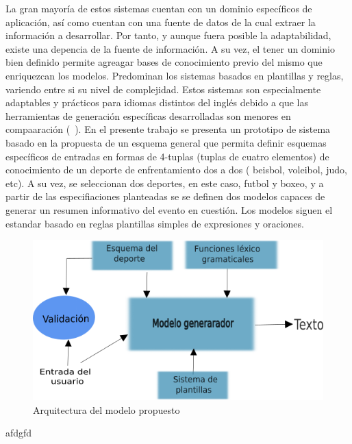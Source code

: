     La gran mayoría de estos sistemas cuentan con un dominio específicos de aplicación, así como cuentan con una fuente de datos de la 
cual extraer la información a desarrollar. Por tanto, y aunque fuera posible la adaptabilidad, existe una depencia de la fuente de información. A su vez, el tener un dominio bien definido  
permite agreagar bases de conocimiento previo del mismo que enriquezcan los modelos. Predominan los sistemas basados en plantillas y reglas, variendo entre si su nivel de complejidad. Estos 
sistemas son especialmente adaptables y prácticos para idiomas distintos del inglés debido a que las herramientas de generación específicas desarrolladas son menores en compaaración (~\cite{gunasiri2021automated}). 
    En el presente trabajo se presenta un prototipo de sistema basado en la propuesta de un esquema general que permita definir esquemas específicos de entradas en formas de 4-tuplas (tuplas de cuatro elementos) de 
conocimiento de un deporte de enfrentamiento dos a dos ( beisbol, voleibol, judo, etc). A su vez, se seleccionan dos deportes, en este caso, futbol y boxeo, y a partir de las especifiaciones planteadas se 
se definen dos modelos capaces de generar un resumen informativo del evento en cuestión. Los modelos siguen el estandar basado en reglas plantillas simples de expresiones y oraciones.


    \begin{figure}[!]
        \begin{center}
            \includegraphics[width=\textwidth]{Graphics/arquitecturaprop2.png}
        \end{center}
        \caption{Arquitectura del modelo propuesto}
        \label{arquitecturadelmodelo}
    \end{figure}

    afdgfd



